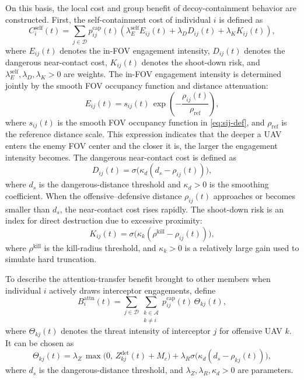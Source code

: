 \documentclass{cja}
\begin{document}
On this basis, the local cost and group benefit of decoy-containment behavior are constructed. First, the self-containment cost of individual $i$ is defined as
\begin{equation}
C_i^{\mathrm{self}}(t)
=
\sum_{j\in\mathcal{D}}
p_{ij}^{\mathrm{cap}}(t)
\left(
\lambda_E^{\mathrm{self}} E_{ij}(t)
+
\lambda_D D_{ij}(t)
+
\lambda_K K_{ij}(t)
\right),
\end{equation}
where $E_{ij}(t)$ denotes the in-FOV engagement intensity, $D_{ij}(t)$ denotes the dangerous near-contact cost, $K_{ij}(t)$ denotes the shoot-down risk, and $\lambda_E^{\mathrm{self}},\lambda_D,\lambda_K>0$ are weights.
The in-FOV engagement intensity is determined jointly by the smooth FOV occupancy function and distance attenuation:
\begin{equation}
E_{ij}(t)
=
s_{ij}(t)\,\exp\!\left(-\frac{\rho_{ij}(t)}{\rho_{\mathrm{ref}}}\right),
\end{equation}
where $s_{ij}(t)$ is the smooth FOV occupancy function in \eqref{eq:sij-def}, and $\rho_{\mathrm{ref}}$ is the reference distance scale. This expression indicates that the deeper a UAV enters the enemy FOV center and the closer it is, the larger the engagement intensity becomes.
The dangerous near-contact cost is defined as
\begin{equation}
D_{ij}(t)
=
\sigma\!\bigl(\kappa_d(d_s-\rho_{ij}(t))\bigr),
\end{equation}
where $d_s$ is the dangerous-distance threshold and $\kappa_d>0$ is the smoothing coefficient. When the offensive--defensive distance $\rho_{ij}(t)$ approaches or becomes smaller than $d_s$, the near-contact cost rises rapidly.
The shoot-down risk is an index for direct destruction due to excessive proximity:
\begin{equation}
K_{ij}(t)
=
\sigma\!\bigl(\kappa_k(\rho^{\mathrm{kill}}-\rho_{ij}(t))\bigr),
\end{equation}
where $\rho^{\mathrm{kill}}$ is the kill-radius threshold, and $\kappa_k>0$ is a relatively large gain used to simulate hard truncation.

To describe the attention-transfer benefit brought to other members when individual $i$ actively draws interceptor engagements, define
\begin{equation}
B_i^{\mathrm{attn}}(t)
=
\sum_{j\in\mathcal{D}}
\sum_{\substack{k\in\mathcal{A}\\k\neq i}}
p_{ij}^{\mathrm{cap}}(t)\,\Theta_{kj}(t),
\end{equation}
where $\Theta_{kj}(t)$ denotes the threat intensity of interceptor $j$ for offensive UAV $k$. It can be chosen as
\begin{equation}
\Theta_{kj}(t)
=
\lambda_Z\,\max\bigl(0,\, Z_{kj}^{\mathrm{det}}(t)+M_c\bigr)
+
\lambda_R \sigma\!\bigl(\kappa_d(d_s-\rho_{kj}(t))\bigr),
\end{equation}
where $d_s$ is the dangerous-distance threshold, and $\lambda_Z,\lambda_R,\kappa_d>0$ are parameters.
\end{document}
